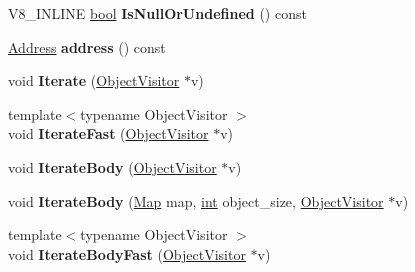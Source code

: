 \begin{DoxyCompactItemize}
\item 
\mbox{\label{classv8_1_1internal_1_1HeapObject_a238d0776fe75f16f95716df4bf9efb2d}} 
V8\+\_\+\+I\+N\+L\+I\+NE \mbox{\hyperlink{classbool}{bool}} {\bfseries Is\+Null\+Or\+Undefined} () const
\item 
\mbox{\label{classv8_1_1internal_1_1HeapObject_ad440840079c8a6579ae7416dde0d8077}} 
\mbox{\hyperlink{classuintptr__t}{Address}} {\bfseries address} () const
\item 
\mbox{\label{classv8_1_1internal_1_1HeapObject_ad87e32c09e00dd3f4470bbb4db518968}} 
void {\bfseries Iterate} (\mbox{\hyperlink{classv8_1_1internal_1_1ObjectVisitor}{Object\+Visitor}} $\ast$v)
\item 
\mbox{\label{classv8_1_1internal_1_1HeapObject_afaa4602f1708e33792afa37ad4b165ec}} 
{\footnotesize template$<$typename Object\+Visitor $>$ }\\void {\bfseries Iterate\+Fast} (\mbox{\hyperlink{classv8_1_1internal_1_1ObjectVisitor}{Object\+Visitor}} $\ast$v)
\item 
\mbox{\label{classv8_1_1internal_1_1HeapObject_a8f9d59c629271dd0dc2d54b9bf412f37}} 
void {\bfseries Iterate\+Body} (\mbox{\hyperlink{classv8_1_1internal_1_1ObjectVisitor}{Object\+Visitor}} $\ast$v)
\item 
\mbox{\label{classv8_1_1internal_1_1HeapObject_a9aa8ca42513d3582de367baf64e1ef9c}} 
void {\bfseries Iterate\+Body} (\mbox{\hyperlink{classv8_1_1internal_1_1Map}{Map}} map, \mbox{\hyperlink{classint}{int}} object\+\_\+size, \mbox{\hyperlink{classv8_1_1internal_1_1ObjectVisitor}{Object\+Visitor}} $\ast$v)
\item 
\mbox{\label{classv8_1_1internal_1_1HeapObject_a201dcc8e6951989d9766d21af1c6ce20}} 
{\footnotesize template$<$typename Object\+Visitor $>$ }\\void {\bfseries Iterate\+Body\+Fast} (\mbox{\hyperlink{classv8_1_1internal_1_1ObjectVisitor}{Object\+Visitor}} $\ast$v)
\item 
\mbox{\label{classv8_1_1internal_1_1HeapObject_a1d36ae59ae29b45ec61974e58bffd6de}} 

\end{DoxyCompactItemize}
